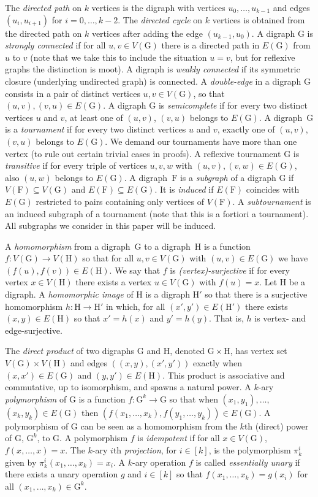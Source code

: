 \documentclass[a4paper,12pt]{article}
\theoremstyle{remark}
\newcommand{\G}{\ensuremath{\mathrm{G}}}
\newcommand{\F}{\ensuremath{\mathrm{F}}}
\renewcommand{\H}{\ensuremath{\mathrm{H}}}
\begin{document}
The \emph{directed path} on $k$ vertices is the digraph with vertices $u_0,\ldots, u_{k-1}$ and edges $(u_i,u_{i+1})$ for $i=0,\ldots,k-2$.
The \emph{directed cycle} on $k$ vertices is obtained from the directed path on $k$ vertices after adding the edge $(u_{k-1},u_0)$.
A digraph $\G$ is \emph{strongly connected} if for all $u,v \in V(\G)$ there is a 
directed path 
in $E(\G)$ from $u$ to $v$ (note that we take this to include the situation $u=v$, but for reflexive graphs the distinction is moot). A digraph is \emph{weakly connected} if its symmetric closure (underlying undirected graph) is connected. A \emph{double-edge} in a digraph $\G$ consists in a pair of distinct vertices $u,v \in V(\G)$, so that $(u,v),(v,u) \in E(\G)$. 
A digraph $\G$ is \emph{semicomplete} if for every two distinct vertices $u$ and $v$, at least one of $(u,v)$, $(v,u)$ belongs to $E(\G)$. 
A digraph~$\G$ is a \emph{tournament} if for every two distinct vertices $u$ and $v$, exactly one of $(u,v)$, $(v,u)$ belongs to $E(\G)$.
We demand our tournaments have more than one vertex (to rule out certain trivial cases in proofs). A reflexive tournament $\G$ is \emph{transitive} if for every triple of vertices $u,v,w$ with $(u,v), (v,w)\in E(\G)$, also $(u,w)$ belongs to $E(\G)$.
 A digraph~$\F$ is a \emph{subgraph} of a digraph $\G$ if $V(\F) \subseteq V(\G)$ and $E(\F) \subseteq E(\G)$. It is \emph{induced} if $E(\F)$ coincides with $E(\G)$ restricted to pairs containing only vertices of $V(\F)$. A \emph{subtournament} is an induced subgraph of a tournament (note that this is a fortiori a tournament). All subgraphs we consider in this paper will be induced.

A \emph{homomorphism} from a digraph~$\G$ to a digraph~$\H$ is a function $f:V(\G)\rightarrow V(\H)$ so that for all $u,v \in V(\G)$ with $(u,v) \in E(\G)$ we have $(f(u),f(v)) \in E(\H)$. We say that $f$ is \emph{(vertex)-surjective} if for every vertex $x\in V(\H)$ there exists a vertex $u\in V(\G)$ with $f(u)=x$.
Let $\H$ be a digraph. A \emph{homomorphic image} of $\H$ is a digraph $\H'$ so that there is a surjective homomorphism $h:\H \rightarrow \H'$ in which, for all $(x',y') \in E(\H')$ there exists $(x,y) \in E(\H)$ so that $x'=h(x)$ and $y'=h(y)$. That is, $h$ is vertex- and edge-surjective.  

The \emph{direct product} of two digraphs $\G$ and $\H$, denoted $\G \times \H$, has vertex set $V(\G) \times V(\H)$ and edges $((x,y),(x',y'))$ exactly when $(x,x') \in E(\G)$ and $(y,y') \in E(\H)$. 
This product is associative and commutative, up to isomorphism, and spawns a natural power.
A $k$-ary \emph{polymorphism} of $\G$ is a function $f:\G^k\rightarrow \G$ so that when $(x_1,y_1),\ldots,$ $(x_k,y_k) \in E(\G)$ then $(f(x_1,\ldots,x_k),f(y_1,\ldots,y_k)) \in E(\G)$. A polymorphism of $\G$ can be seen as a homomorphism from the $k$th (direct) power of $\G$, $\G^k$, to $\G$. A polymorphism $f$ is \emph{idempotent} if for all $x\in V(\G)$, $f(x,\ldots,x)=x$.
The $k$-ary $i$th \emph{projection}, for $i \in [k]$, is the polymorphism $\pi^i_k$ given by $\pi^i_k(x_1,\ldots,x_k)=x_i$. 
A $k$-ary operation $f$ is called \emph{essentially unary} if there exists a unary operation $g$ and $i \in [k]$ so that $f(x_1,\ldots,x_k)=g(x_i)$
for all $(x_1,\ldots,x_k)\in \G^k$.
\end{document}
